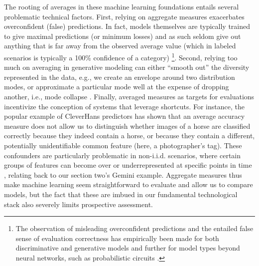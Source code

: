 \documentclass[manuscript,screen,authorversion,nonacm]{acmart}
\begin{document}
The rooting of averages in these machine learning foundations entails several problematic technical factors. First, relying on aggregate measures exacerbates overconfident (false) predictions. In fact, models themselves are typically trained to give maximal predictions (or minimum losses) and as such seldom give out anything that is far away from the observed average value (which in labeled scenarios is typically a 100\% confidence of a category) \cite{Hendrycks2017SoftmaxOOD,Ovadia2019TrustUncertainty} \footnote{The observation of misleading overconfident predictions and the entailed false sense of evaluation correctness has empirically been made for both discriminative and generative models \cite{Nalisnick2019DoDeepGenerativesKnow} and further for model types beyond neural networks, such as probabilistic circuits \cite{Ventola2023DoPCsKnow}.}. Second, relying too much on averaging in generative modeling can either ``smooth out'' the diversity represented in the data, e.g., we create an envelope around two distribution modes, or approximate a particular mode well at the expense of dropping another, i.e., mode collapse \cite{kristiadi2016kl}. Finally, averaged measures as targets for evaluations incentivize the conception of systems that leverage shortcuts. For instance, the popular example of CleverHans predictors \cite{Lapuschkin2019CleverHans} has shown that an average accuracy measure does not allow us to distinguish whether images of a horse are classified correctly because they indeed contain a horse, or because they contain a different, potentially unidentifiable common feature (here, a photographer's tag). These confounders are particularly problematic in non-i.i.d. scenarios, where certain groups of features can become over or underrepresented at specific points in time \cite{busch2024truthriskgettingconfounded}, relating back to our section two's Gemini example. Aggregate measures thus make machine learning seem straightforward to evaluate and allow us to compare models, but the fact that these are imbued in our fundamental technological stack also severely limits prospective assessment.  \\
\end{document}
